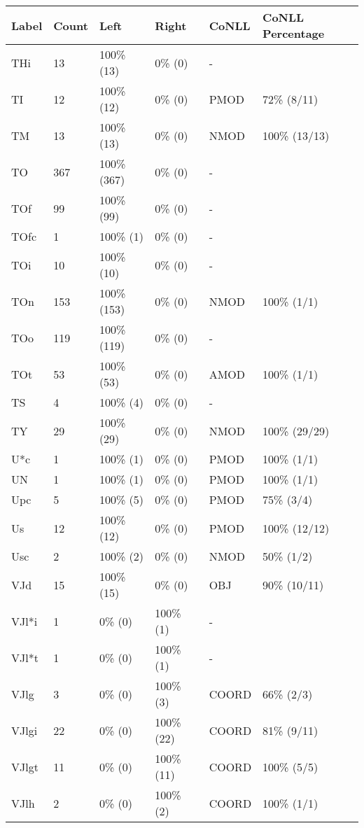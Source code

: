 \begin{figure*}
\begin{tabular}{|l|l|l|l||l|l|}
\hline
Label & Count & Left & Right & CoNLL & CoNLL Percentage\\ 
\hline
 THi & 13 & 100\% (13) & 0\% (0) & - &  \\ 
\hline
 TI & 12 & 100\% (12) & 0\% (0) & PMOD & 72\% (8/11) \\ 
\hline
 TM & 13 & 100\% (13) & 0\% (0) & NMOD & 100\% (13/13) \\ 
\hline
 TO & 367 & 100\% (367) & 0\% (0) & - &  \\ 
\hline
 TOf & 99 & 100\% (99) & 0\% (0) & - &  \\ 
\hline
 TOfc & 1 & 100\% (1) & 0\% (0) & - &  \\ 
\hline
 TOi & 10 & 100\% (10) & 0\% (0) & - &  \\ 
\hline
 TOn & 153 & 100\% (153) & 0\% (0) & NMOD & 100\% (1/1) \\ 
\hline
 TOo & 119 & 100\% (119) & 0\% (0) & - &  \\ 
\hline
 TOt & 53 & 100\% (53) & 0\% (0) & AMOD & 100\% (1/1) \\ 
\hline
 TS & 4 & 100\% (4) & 0\% (0) & - &  \\ 
\hline
 TY & 29 & 100\% (29) & 0\% (0) & NMOD & 100\% (29/29) \\ 
\hline
 U*c & 1 & 100\% (1) & 0\% (0) & PMOD & 100\% (1/1) \\ 
\hline
 UN & 1 & 100\% (1) & 0\% (0) & PMOD & 100\% (1/1) \\ 
\hline
 Upc & 5 & 100\% (5) & 0\% (0) & PMOD & 75\% (3/4) \\ 
\hline
 Us & 12 & 100\% (12) & 0\% (0) & PMOD & 100\% (12/12) \\ 
\hline
 Usc & 2 & 100\% (2) & 0\% (0) & NMOD & 50\% (1/2) \\ 
\hline
 VJd & 15 & 100\% (15) & 0\% (0) & OBJ & 90\% (10/11) \\ 
\hline
 VJl*i & 1 & 0\% (0) & 100\% (1) & - &  \\ 
\hline
 VJl*t & 1 & 0\% (0) & 100\% (1) & - &  \\ 
\hline
 VJlg & 3 & 0\% (0) & 100\% (3) & COORD & 66\% (2/3) \\ 
\hline
 VJlgi & 22 & 0\% (0) & 100\% (22) & COORD & 81\% (9/11) \\ 
\hline
 VJlgt & 11 & 0\% (0) & 100\% (11) & COORD & 100\% (5/5) \\ 
\hline
 VJlh & 2 & 0\% (0) & 100\% (2) & COORD & 100\% (1/1) \\ 

\end{tabular}
\end{figure*}
